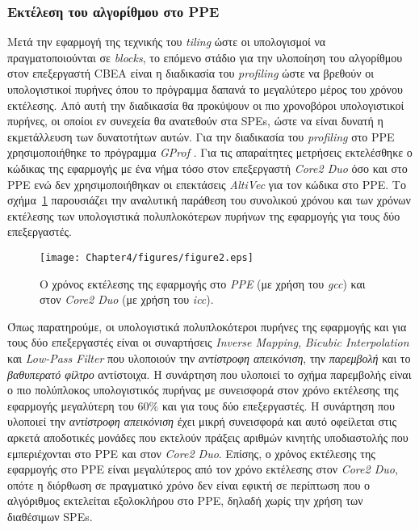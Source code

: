 \subsubsection{Εκτέλεση του αλγορίθμου στο PPE}
\label{subsubsection:subsub4121}
\indent
Μετά την εφαρμογή της τεχνικής του \textsl{tiling} ώστε οι υπολογισμοί να πραγματοποιούνται σε \textsl{blocks}, το επόμενο στάδιο για την υλοποίηση του αλγορίθμου στον επεξεργαστή \ac{CBEA} είναι η διαδικασία του \textsl{profiling} ώστε να βρεθούν οι υπολογιστικοί πυρήνες όπου το πρόγραμμα δαπανά το μεγαλύτερο μέρος του χρόνου εκτέλεσης. Από αυτή την διαδικασία θα προκύψουν οι πιο χρονοβόροι υπολογιστικοί πυρήνες, οι οποίοι εν συνεχεία θα ανατεθούν στα \acp{SPE}, ώστε να είναι δυνατή η εκμετάλλευση των δυνατοτήτων αυτών. Για την διαδικασία του \textsl{profiling} στο \ac{PPE} χρησιμοποιήθηκε το πρόγραμμα \textsl{GProf} \cite{gprof}. Για τις απαραίτητες μετρήσεις εκτελέσθηκε ο κώδικας της εφαρμογής με ένα νήμα τόσο στον επεξεργαστή \textsl{Core2 Duo} όσο και στο \ac{PPE} ενώ δεν χρησιμοποιήθηκαν οι επεκτάσεις \textsl{AltiVec} για τον κώδικα στο \ac{PPE}. Το σχήμα~\ref{figure:fig42} παρουσιάζει την αναλυτική παράθεση του συνολικού χρόνου και των χρόνων εκτέλεσης των υπολογιστικά πολυπλοκότερων πυρήνων της εφαρμογής για τους δύο επεξεργαστές.
\begin{figure}
\centering
\texttt{[image: Chapter4/figures/figure2.eps]}
\caption{Ο χρόνος εκτέλεσης της εφαρμογής στο \textsl{PPE} (με χρήση του \textsl{gcc}) και στον \textsl{Core2 Duo} (με χρήση του \textsl{icc}).}
\label{figure:fig42}
\end{figure}
\newline \indent
Όπως παρατηρούμε, οι υπολογιστικά πολυπλοκότεροι πυρήνες της εφαρμογής και για τους δύο επεξεργαστές είναι οι συναρτήσεις \textsl{Inverse Mapping}, \textsl{Bicubic Interpolation} και \textsl{Low-Pass Filter} που υλοποιούν την \textsl{αντίστροφη απεικόνιση}, την \textsl{παρεμβολή} και το \textsl{βαθυπερατό φίλτρο} αντίστοιχα. Η συνάρτηση που υλοποιεί το σχήμα παρεμβολής είναι ο πιο πολύπλοκος υπολογιστικός πυρήνας με συνεισφορά στον χρόνο εκτέλεσης της εφαρμογής μεγαλύτερη του \(60\%\) και για τους δύο επεξεργαστές. Η συνάρτηση που υλοποιεί την \textsl{αντίστροφη απεικόνιση} έχει μικρή συνεισφορά και αυτό οφείλεται στις αρκετά αποδοτικές μονάδες που εκτελούν πράξεις αριθμών κινητής υποδιαστολής που εμπεριέχονται στο \ac{PPE} και στον \textsl{Core2 Duo}. Επίσης, ο χρόνος εκτέλεσης της εφαρμογής στο \ac{PPE} είναι μεγαλύτερος από τον χρόνο εκτέλεσης στον \textsl{Core2 Duo}, οπότε η διόρθωση σε πραγματικό χρόνο δεν είναι εφικτή σε περίπτωση που ο αλγόριθμος εκτελείται εξολοκλήρου στο \ac{PPE}, δηλαδή χωρίς την χρήση των διαθέσιμων \acp{SPE}.\newline \indent
